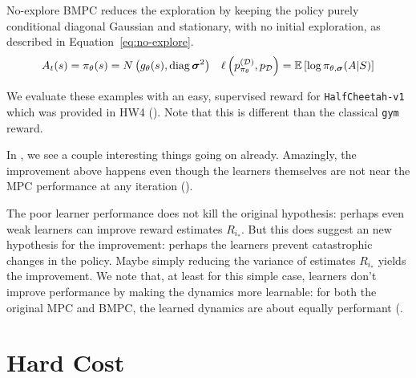 \documentclass{article}
\begin{document}
No-explore \textsc{BMPC} reduces the exploration by keeping the policy purely conditional diagonal Gaussian and stationary, with no initial exploration, as described in Equation~\ref{eq:no-explore}.
\begin{align} \label{eq:no-explore}
  A_t(s)= \pi_\theta(s)=N\left({g_\theta(s), \operatorname{diag}{\boldsymbol\sigma}^2}\right) && \ell\left({p_{\pi_\theta}^{(\mathcal{D})},p_{\mathcal{D}}}\right)=\operatorname{\mathbb{E}}\left[{\log \pi_{\theta,{\boldsymbol\sigma}}(A|S)}\right]
\end{align}

We evaluate these examples with an easy, supervised reward for \texttt{HalfCheetah-v1} which was provided in HW4 (). Note that this is different than the classical \texttt{gym} reward.


In , we see a couple interesting things going on already. Amazingly, the improvement above happens even though the learners themselves are not near the MPC performance at any iteration ().


The poor learner performance does not kill the original hypothesis: perhaps even weak learners can improve reward estimates $R_{i_*}$. But this does suggest an new hypothesis for the improvement: perhaps the learners prevent catastrophic changes in the policy. Maybe simply reducing the variance of estimates $R_{i_*}$ yields the improvement. We note that, at least for this simple case, learners don't improve performance by making the dynamics more learnable: for both the original MPC and \textsc{BMPC}, the learned dynamics are about equally performant (.


\section{Hard Cost}
\end{document}
